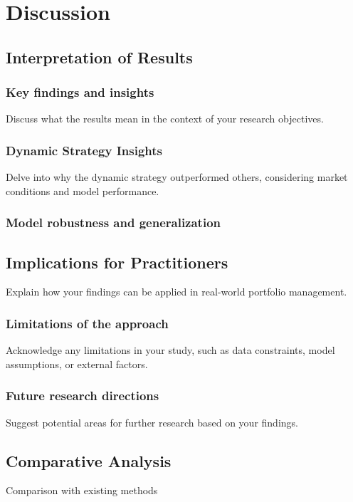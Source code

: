 
\chapter{Discussion}\label{chapter:discussion}

\section{Interpretation of Results}

\subsection{Key findings and insights}
Discuss what the results mean in the context of your research objectives.

\subsection{Dynamic Strategy Insights}
Delve into why the dynamic strategy outperformed others, considering market conditions and model performance.
\subsection{Model robustness and generalization}

\section{Implications for Practitioners}
Explain how your findings can be applied in real-world portfolio management.

\subsection{Limitations of the approach}
Acknowledge any limitations in your study, such as data constraints, model assumptions, or external factors.

\subsection{Future research directions}
Suggest potential areas for further research based on your findings.

\section{Comparative Analysis}
Comparison with existing methods

